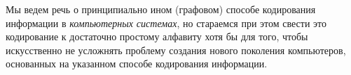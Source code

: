 Мы ведем речь о принципиально ином (графовом) способе кодирования информации в \textit{компьютерных системах}, но стараемся при этом свести это кодирование к достаточно простому алфавиту хотя бы для того, чтобы искусственно не усложнять проблему создания нового поколения компьютеров, основанных на указанном способе кодирования информации. 

